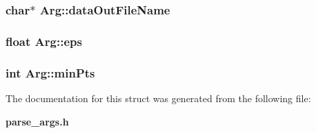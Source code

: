 \subsubsection{\setlength{\rightskip}{0pt plus 5cm}char$\ast$ {\bf Arg::dataOutFileName}}\label{structArg_84f700aa42049c9f623ff8bf4df94c15}


\subsubsection{\setlength{\rightskip}{0pt plus 5cm}float {\bf Arg::eps}}\label{structArg_e44675a7f4b3a1c0b3892e0df84aa6cb}


\subsubsection{\setlength{\rightskip}{0pt plus 5cm}int {\bf Arg::minPts}}\label{structArg_cfe493c2e3ee906bbf1d832caca64da6}




The documentation for this struct was generated from the following file:\begin{CompactItemize}
\item 
{\bf parse\_\-args.h}\end{CompactItemize}
